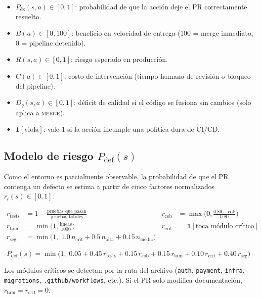 \documentclass[11pt,a4paper]{article}
\newcommand{\Pdef}{P_{\text{def}}}
\begin{document}
\begin{itemize}[leftmargin=*]
\item $P_{\text{éx}}(s,a) \in [0,1]$: probabilidad de que la acción deje el PR correctamente resuelto.
\item $B(a) \in [0,100]$: beneficio en velocidad de entrega (100 = merge inmediato, 0 = pipeline detenido).
\item $R(s,a) \in [0,1]$: riesgo esperado en producción.
\item $C(a) \in [0,1]$: costo de intervención (tiempo humano de revisión o bloqueo del pipeline).
\item $D_q(s,a) \in [0,1]$: déficit de calidad si el código se fusiona sin cambios (solo aplica a \textsc{merge}).
\item $\mathbf{1}[\text{viola}]$: vale 1 si la acción incumple una política dura de CI/CD.
\end{itemize}

\subsection{Modelo de riesgo $\Pdef(s)$}

Como el entorno es parcialmente observable, la probabilidad de que el PR contenga un defecto se
estima a partir de cinco factores normalizados $r_i(s) \in [0,1]$:

\begin{align}
r_{\text{tests}} &= 1 - \frac{\text{pruebas que pasan}}{\text{pruebas totales}} &
r_{\text{cob}} &= \max\!\Big(0, \frac{0.80 - \text{cob}}{0.80}\Big) \nonumber\\
r_{\text{tam}} &= \min\!\Big(1, \frac{\text{líneas}}{1000}\Big) &
r_{\text{crit}} &= \mathbf{1}[\text{toca módulo crítico}] \nonumber\\
r_{\text{seg}} &= \min\big(1,\; 1.0\,n_{\text{crít}} + 0.5\,n_{\text{alta}} + 0.15\,n_{\text{media}}\big) \nonumber
\end{align}

\begin{equation}
\label{eq:pdef}
\Pdef(s) = \min\Big(1,\; 0.05 + 0.45\,r_{\text{tests}} + 0.15\,r_{\text{cob}} + 0.15\,r_{\text{tam}}
+ 0.10\,r_{\text{crit}} + 0.40\,r_{\text{seg}}\Big)
\end{equation}

\noindent Los módulos críticos se detectan por la ruta del archivo (\texttt{auth}, \texttt{payment},
\texttt{infra}, \texttt{migrations}, \texttt{.github/workflows}, etc.). Si el PR solo modifica
documentación, $r_{\text{tam}} = r_{\text{crit}} = 0$.
\end{document}
